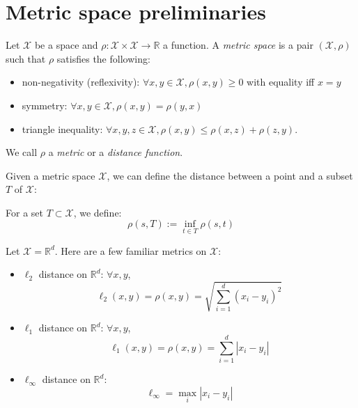 \section{Metric space preliminaries}
\begin{definition}
Let $\mathcal{X}$ be a space and $\rho: \mathcal{X} \times \mathcal{X}
\to \mathbb{R}$ a function. A \emph{metric space} is a pair
$(\mathcal{X},\rho)$ such that $\rho$ satisfies the following:
\begin{itemize}
\item non-negativity (reflexivity): $\forall x,y \in \mathcal{X},
  \rho(x,y) \ge 0$ with equality iff $x=y$ 
\item symmetry: $\forall x,y \in \mathcal{X}, \rho(x,y) = \rho(y,x)$ 
\item triangle inequality: $\forall x,y,z \in \mathcal{X}, \rho(x,y)
  \le \rho(x,z) + \rho(z,y)$. 
\end{itemize}
We call $\rho$ a \emph{metric} or a \emph{distance function}. 
\end{definition}
Given a metric space $\mathcal{X}$, we can define the distance between
a point and a subset $T$ of $\mathcal{X}$: 
\begin{definition}
For a set $T \subset \mathcal{X}$, we define: 
\[\rho(s,T) := \inf_{t\in T} \rho(s,t)\]
\end{definition}

\begin{example} Let $\mathcal{X} = \mathbb{R}^d$. Here are a few
familiar metrics on $\mathcal{X}$:
\begin{itemize}
\item $\ell_2$ distance on $\mathbb{R}^d$: $\forall x,y$,
\[\ell_2(x,y) = \rho(x,y) = \sqrt{\sum_{i=1}^d (x_i - y_i)^2}\] 
\item $\ell_1$  distance on $\mathbb{R}^d$: $\forall x,y$, 
\[\ell_1(x,y) = \rho(x,y) = \sum_{i=1}^d |x_i - y_i|\]
\item $\ell_\infty$ distance on $\mathbb{R}^d$: 
\[\ell_{\infty} = \max_i |x_i - y_i|\]
\end{itemize}
\end{example}

